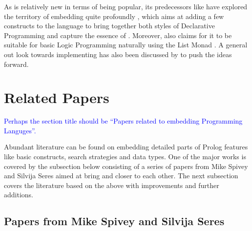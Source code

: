 \documentclass[thesis-solanki.tex]{subfiles}
\begin{document}
As  is relatively new in terms of being popular, its predecessors like
 have
explored the territory of embedding  quite profoundly \cite{friedman05reasoned}, which aims at adding a few
constructs to the language to bring together both styles of Declarative Programming and capture the essence of
.
Moreover,  also claims for it to be suitable for basic Logic Programming naturally using the List
Monad \cite{website:logicprogexamplehaskell}.
A general out look towards implementing  has also been discussed by
\cite{krishnamurthi2007programming} to push the ideas forward.

\section{Related Papers}
\textcolor{blue}{Perhaps the section title should be ``Papers related to embedding Programming Languges''.}

Abundant literature
can be found on embedding detailed parts of Prolog features
like basic constructs, search strategies and data types.
One of the major works is covered by the subsection below consisting of a series of papers from Mike Spivey and
Silvija Seres aimed at bring  and  closer to each other.
The next subsection covers the literature based on the above
with improvements and further additions.


\subsection{Papers from Mike Spivey and Silvija Seres}
\end{document}
